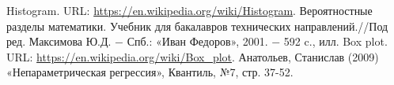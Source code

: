 \newpage


\begin{thebibliography}{}
	  Histogram. URL: \url{https://en.wikipedia.org/wiki/Histogram}.
	  Вероятностные разделы математики. Учебник для бакалавров технических направлений.//Под ред. Максимова Ю.Д. $ - $ Спб.: «Иван Федоров»,
	2001. $ - $ 592 c., илл.
	  Box plot. URL: \url{https://en.wikipedia.org/wiki/Box_plot}.
	  Анатольев, Станислав (2009) «Непараметрическая регрессия», Квантиль, №7, стр. 37-52.
\end{thebibliography}